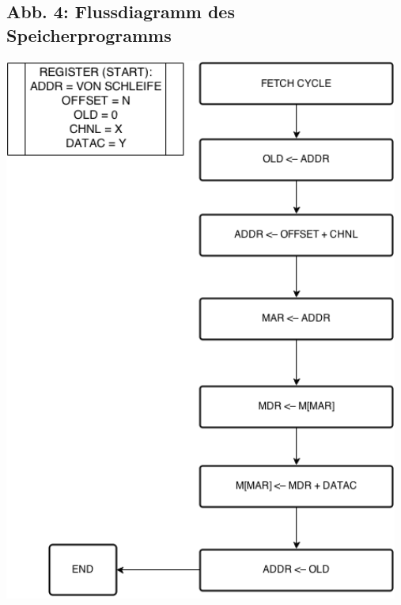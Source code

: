 \documentclass[12pt,titlepage]{article}
\begin{document}
\subsection{Abb. 4: Flussdiagramm des Speicherprogramms}
\includegraphics[width=13cm]{saveToHS.png}
\end{document}

